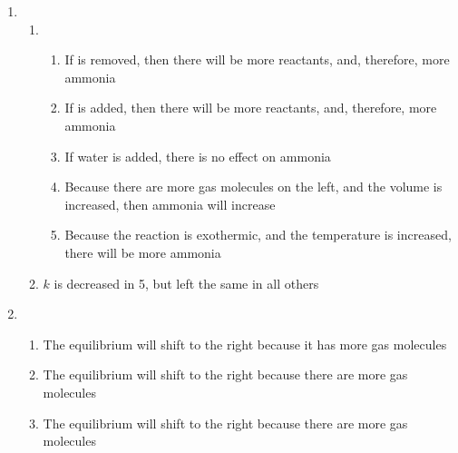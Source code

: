 \documentclass[12pt]{article}
\begin{document}
\begin{enumerate}
\begin{enumerate}
    \end{enumerate}

    \setcounter{enumi}{49}

  \item

    \begin{enumerate}
        
      \item 

        \begin{enumerate}

      \item If  is removed, then there will be more reactants, and, therefore, more ammonia

      \item If  is added, then there will be more reactants, and, therefore, more ammonia

      \item If water is added, there is no effect on ammonia

      \item Because there are more gas molecules on the left, and the volume is increased, then ammonia will increase

      \item Because the reaction is exothermic, and the temperature is increased, there will be more ammonia

        \end{enumerate}

      \item $k$ is decreased in 5, but left the same in all others

    \end{enumerate}

    \setcounter{enumi}{51}

  \item

    \begin{enumerate}

      \item The equilibrium will shift to the right because it has more gas molecules

      \item The equilibrium will shift to the right because there are more gas molecules

      \item The equilibrium will shift to the right because there are more gas molecules

    \end{enumerate}

\end{enumerate}
\end{document}
